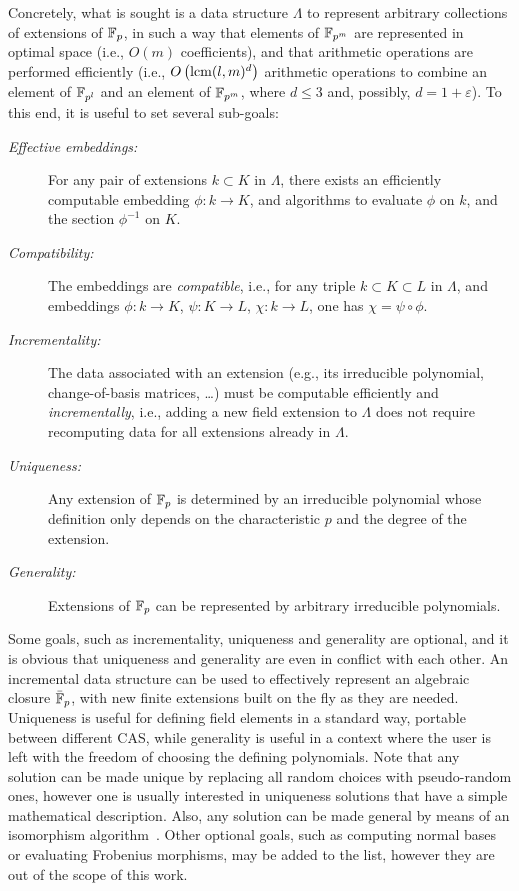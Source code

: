 \documentclass{sig-alternate}
\begin{document}
Concretely, what is sought is a data structure $\Lambda$ to represent
arbitrary collections of extensions of $\mathbb{F}_{p}$, in such a way that
elements of $\mathbb{F}_{p^m}$ are represented in optimal space (i.e., $O(m)$
coefficients), and that arithmetic operations are performed
efficiently (i.e., $O\left(\operatorname{lcm}(l,m)^d\right)$ arithmetic
operations to combine an element of $\mathbb{F}_{p^l}$ and an element of
$\mathbb{F}_{p^m}$, where $d\le 3$ and, possibly, $d=1+\varepsilon$). %
To this end, it is useful to set several sub-goals:

\begin{description}
\item[\emph{Effective embeddings:}] For any pair of extensions
  $k\subset K$ in $\Lambda$, there exists an efficiently computable
  embedding $\phi:k\to K$, and algorithms to evaluate $\phi$ on $k$,
  and the section $\phi^{-1}$ on $K$.
\item[\emph{Compatibility:}] The embeddings are \emph{compatible},
  i.e., for any triple $k\subset K\subset L$ in $\Lambda$, and
  embeddings $\phi:k\to K$, $\psi:K\to L$, $\chi:k\to L$, one has
  $\chi=\psi\circ\phi$.
\item[\emph{Incrementality:}] The data associated with an extension
  (e.g., its irreducible polynomial, change-of-basis matrices, \dots)
  must be computable efficiently and \emph{incrementally}, i.e.,
  adding a new field extension to $\Lambda$ does not require
  recomputing data for all extensions already in $\Lambda$. %
\item[\emph{Uniqueness:}] Any extension of $\mathbb{F}_{p}$ is determined by an
  irreducible polynomial whose definition only depends on the
  characteristic $p$ and the degree of the extension. %
\item[\emph{Generality:}] Extensions of $\mathbb{F}_{p}$ can be represented by
  arbitrary irreducible polynomials.
\end{description}

Some goals, such as incrementality, uniqueness and generality are
optional, and it is obvious that uniqueness and generality are even in
conflict with each other. %
An incremental data structure can be used to effectively represent an
algebraic closure $\bar{\mathbb{F}}_{p}$, with new finite extensions built on the
fly as they are needed. %
Uniqueness is useful for defining field elements in a standard way,
portable between different CAS, while generality is useful in a
context where the user is left with the freedom of choosing the
defining polynomials. %
Note that any solution can be made unique by replacing all random
choices with pseudo-random ones, however one is usually interested in
uniqueness solutions that have a simple mathematical description. %
Also, any solution can be made general by means of an isomorphism
algorithm~\cite{LenstraJr91,Allombert02,rains2008,brieulle2018computing,narayanan2016fast}. %
Other optional goals, such as computing normal bases or evaluating
Frobenius morphisms, may be added to the list, however they are out of
the scope of this work.
\end{document}
